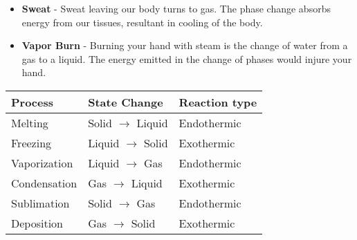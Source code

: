 \documentclass{article}
\begin{document}
\hspace{-30pt}\begin{minipage}{0.435\textwidth}
	
\begin{itemize}
	\item \textbf{Sweat} - Sweat leaving our body turns to gas. The phase change absorbs energy from our tissues, resultant in cooling of the body.
	\item \textbf{Vapor Burn} - Burning your hand with steam is the change of water from a gas to a liquid. The energy emitted in the change of phases would injure your hand.
\end{itemize}

\end{minipage}
\hspace{5pt}\begin{minipage}{0.7\textwidth}
	
	\renewcommand{\Tstrut}{\rule{0pt}{3ex}}         %
	\renewcommand{\Bstrut}{\rule[1ex]{0pt}{0pt}}   %
	\renewcommand{\TBstrut}{\Tstrut\Bstrut} 
	\newcommand{\TTstrut}{\rule{0pt}{1ex}}         %
	\newcommand{\BBstrut}{\rule[1ex]{0pt}{0pt}}   %
	\newcommand{\TTBBstrut}{\Tstrut\Bstrut} 
	\begin{tabular}{l@{\qquad\quad}l@{\qquad\quad}l}
		\hline
		\textbf{Process} & \textbf{State Change} & \textbf{Reaction type}\\
\hline 
Melting & \textcolor{red1!80!pag}{Solid} $\longrightarrow$ \textcolor{red3!80!pag}{Liquid} & \textcolor{pag!50}{Endothermic}\TBstrut \\
Freezing & \textcolor{red3!80!pag}{Liquid} $\longrightarrow$ \textcolor{red1!80!pag}{Solid} & \textcolor{pag!50}{Exothermic} \TTBBstrut \\
Vaporization & \textcolor{red3!80!pag}{Liquid} $\longrightarrow$ \textcolor{red5!80!pag}{Gas} & \textcolor{pag!50}{Endothermic}\TTBBstrut \\
Condensation & \textcolor{red5!80!pag}{Gas} $\longrightarrow$ \textcolor{red3!80!pag}{Liquid} & \textcolor{pag!50}{Exothermic}\TTBBstrut \\
Sublimation & \textcolor{red1!80!pag}{Solid} $\longrightarrow$ \textcolor{red5!80!pag}{Gas} & \textcolor{pag!50}{Endothermic}\TTBBstrut \\
Deposition & \textcolor{red5!80!pag}{Gas} $\longrightarrow$ \textcolor{red1!80!pag}{Solid} & \textcolor{pag!50}{Exothermic}\TTBBstrut \\
\hline
	\end{tabular}

\end{minipage}
\end{document}
